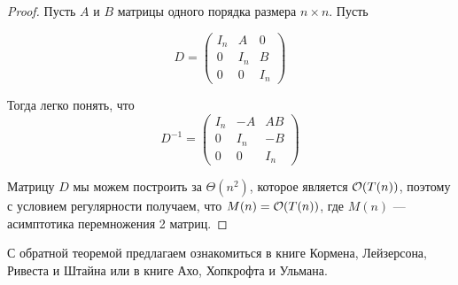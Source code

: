\begin{proof}
  Пусть $A$ и $B$ матрицы одного порядка размера $n \times n$. Пусть

  \[D = 
  \begin{pmatrix}
      I_n & A & 0\\
      0 & I_n & B\\
      0 & 0 & I_n
  \end{pmatrix}\]

  Тогда легко понять, что
  \[
    D^{-1} =
    \begin{pmatrix}
      I_n & -A & AB\\
      0 & I_n & -B \\
      0 & 0 & I_n
    \end{pmatrix}
  \]

  Матрицу $D$ мы можем построить за $\Theta(n^2)$, которое является $\mathcal{O}(T(n))$,
  поэтому с условием регулярности получаем, что $M(n) = \mathcal{O}(T(n))$, где $M(n)$ ---
  асимптотика перемножения 2 матриц.
\end{proof}

С обратной теоремой предлагаем ознакомиться в книге Кормена, Лейзерсона, 
Ривеста и Штайна или в книге Ахо, Хопкрофта и Ульмана.






